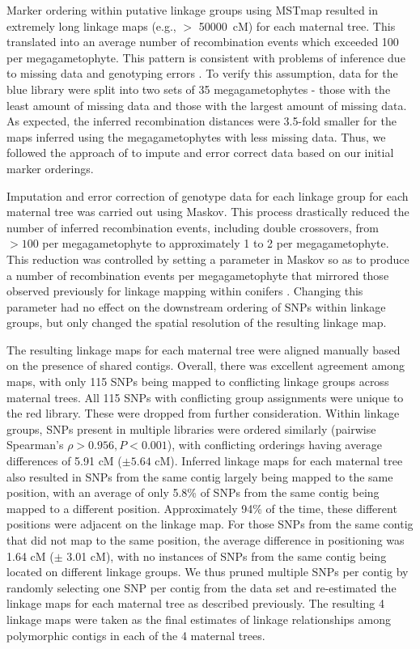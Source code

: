 \documentclass[smallextended]{svjour3}
\begin{document}
Marker ordering within putative linkage groups using MSTmap resulted in
extremely long linkage maps (e.g., $>$ \SI{50000} {cM}) for each maternal tree.
This translated into an average number of recombination events which exceeded
\num{100} per megagametophyte. This pattern is consistent with problems of
inference due to missing data and genotyping errors \citep{Ward:2013}. To verify
this assumption, data for the blue library were split into two sets of \num{35}
megagametophytes - those with the least amount of missing data and those with
the largest amount of missing data. As expected, the inferred recombination
distances were 3.5-fold smaller for the maps inferred using the megagametophytes
with less missing data. Thus, we followed the approach of \citet{Ward:2013} to
impute and error correct data based on our initial marker orderings.

Imputation and error correction of genotype data for each linkage group for each
maternal tree was carried out using Maskov. This process drastically reduced the
number of inferred recombination events, including double crossovers, from
$>100$ per megagametophyte to approximately \num{1} to \num{2} per
megagametophyte. This reduction was controlled by setting a parameter in Maskov
so as to produce a number of recombination events per megagametophyte that
mirrored those observed previously for linkage mapping within conifers
\citep{Eckert:2009, Martinez-Garcia:2013}. Changing this parameter had no effect
on the downstream ordering of SNPs within linkage groups, but only changed the
spatial resolution of the resulting linkage map.

The resulting linkage maps for each maternal tree were aligned manually based on
the presence of shared contigs. Overall, there was excellent agreement among
maps, with only 115 SNPs being mapped to conflicting linkage groups across
maternal trees. All 115 SNPs with conflicting group assignments were unique to
the red library. These were dropped from further consideration.  Within linkage
groups, SNPs present in multiple libraries were ordered similarly (pairwise
Spearman's $\rho > 0.956, P < 0.001$), with conflicting orderings having average
differences of \num{5.91} cM ($\pm 5.64$ cM). Inferred linkage maps for
each maternal tree also resulted in SNPs from the same contig largely being
mapped to the same position, with an average of only 5.8\% of SNPs from the same
contig being mapped to a different position.  Approximately 94\% of the time,
these different positions were adjacent on the linkage map. For those SNPs from
the same contig that did not map to the same position, the average difference in
positioning was 1.64 cM ($\pm$ 3.01 cM), with no instances of SNPs from the same
contig being located on different linkage groups. We thus pruned multiple SNPs
per contig by randomly selecting one SNP per contig from the data set and
re-estimated the linkage maps for each maternal tree as described previously.
The resulting \num{4} linkage maps were taken as the final estimates of linkage
relationships among polymorphic contigs in each of the \num{4} maternal trees.
\end{document}
